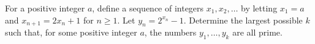 For a positive integer $a$, define a sequence of integers $x_1,x_2,\ldots$ by letting $x_1=a$ and $x_{n+1}=2x_n+1$ for $n\geq 1$. Let $y_n=2^{x_n}-1$. Determine the largest possible $k$ such that, for some positive integer $a$, the numbers $y_1,\ldots,y_k$ are all prime.
